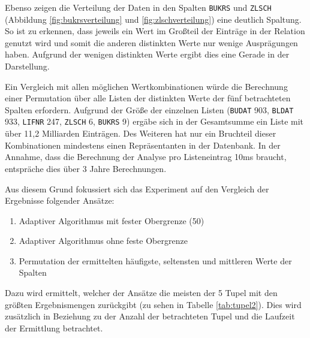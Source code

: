 Ebenso zeigen die Verteilung der Daten in den Spalten \texttt{BUKRS} und \texttt{ZLSCH} (Abbildung \ref{fig:bukrsverteilung} und \ref{fig:zlschverteilung}) eine deutlich Spaltung.
So ist zu erkennen, dass jeweils ein Wert im Großteil der Einträge in der Relation genutzt wird und somit die anderen distinkten Werte nur wenige Ausprägungen haben.
Aufgrund der wenigen distinkten Werte ergibt dies eine Gerade in der Darstellung.

Ein Vergleich mit allen möglichen Wertkombinationen würde die Berechnung einer Permutation über alle Listen der distinkten Werte der fünf betrachteten Spalten erfordern.
Aufgrund der Größe der einzelnen Listen (\texttt{BUDAT} 903, \texttt{BLDAT} 933, \texttt{LIFNR} 247, \texttt{ZLSCH} 6, \texttt{BUKRS} 9) ergäbe sich in der Gesamtsumme ein Liste mit über 11,2 Milliarden Einträgen.
Des Weiteren hat nur ein Bruchteil dieser Kombinationen mindestens einen Repräsentanten in der Datenbank.
In der Annahme, dass die Berechnung der Analyse pro Listeneintrag 10ms braucht, entspräche dies über 3 Jahre Berechnungen.

Aus diesem Grund fokussiert sich das Experiment auf den Vergleich der Ergebnisse folgender Ansätze:

   \begin{enumerate}
      \item Adaptiver Algorithmus mit fester Obergrenze (50)
      \item Adaptiver Algorithmus ohne feste Obergrenze
			\item Permutation der ermittelten häufigste, seltensten und mittleren Werte der Spalten
   \end{enumerate}

Dazu wird ermittelt, welcher der Ansätze die meisten der 5 Tupel mit den größten Ergebnismengen zurückgibt (zu sehen in Tabelle \ref{tab:tupel2}).
Dies wird zusätzlich in Beziehung zu der Anzahl der betrachteten Tupel und die Laufzeit der Ermittlung betrachtet.

\begin{table}[h]
	\centering
	\caption{Eingabetupel für mit den meisten Ergebnissen}
	\label{tab:tupel2}
\end{table}

